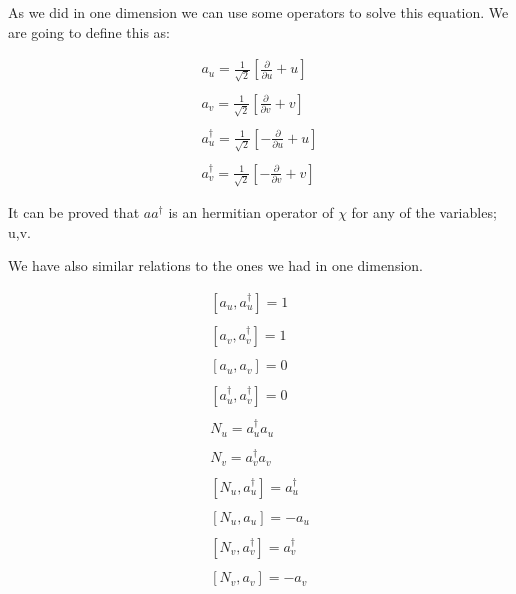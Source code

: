 As we did in one dimension we can use some operators to solve this equation. We are going to define this as:

\begin{equation}
  \begin{array}{c}
    a_u = \frac{1}{\sqrt{2}}\left[\frac{\partial}{\partial u}+u\right]
    \\

    \\
    a_v = \frac{1}{\sqrt{2}}\left[\frac{\partial}{\partial v}+v\right]
    \\

    \\
    a_u^{\dagger} = \frac{1}{\sqrt{2}}\left[-\frac{\partial}{\partial u}+u\right]
    \\

    \\
    a_v^{\dagger} = \frac{1}{\sqrt{2}}\left[-\frac{\partial}{\partial v}+v\right]
  \end{array}
\end{equation}

It can be proved that $a a^{\dagger}$ is an hermitian operator of $\chi$ for any of the variables; u,v.

We have also similar relations to the ones we had in one dimension.

\begin{equation}
  \begin{array}{c}
    \left[a_u,a_u^{\dagger}\right] = 1
    \\

    \\
    \left[a_v,a_v^{\dagger}\right] = 1
    \\

    \\
    \left[a_u,a_v\right] = 0
    \\

    \\
    \left[a_u^{\dagger},a_v^{\dagger}\right] = 0
    \\

    \\
    N_u = a_u^{\dagger}a_u
    \\

    \\
    N_v = a_v^{\dagger}a_v
    \\

    \\
    \left[N_u,a_u^{\dagger}\right] = a_u^{\dagger}
    \\

    \\
    \left[N_u,a_u\right] = -a_u
    \\

    \\
    \left[N_v,a_v^{\dagger}\right] = a_v^{\dagger}
    \\

    \\
    \left[N_v,a_v\right] = -a_v
  \end{array}
\end{equation}

